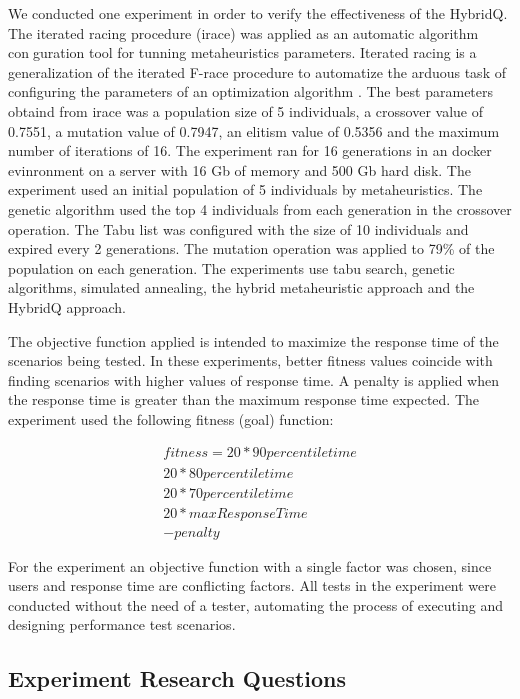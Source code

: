 \documentclass[espaco=umemeio,chapter=TITLE,twoside,openright]{abnt}
\begin{document}
We conducted one experiment in order to verify the effectiveness of the HybridQ. The iterated racing procedure (irace) was applied as an automatic algorithm conguration tool for tunning metaheuristics parameters. Iterated racing is a generalization of the iterated F-race procedure to automatize the arduous task of configuring the parameters of an optimization algorithm \cite{ManuelLopez-IbanezJeremieDubois-LacosteLesliePerezCaceresMauroBirattari2016}. The best parameters obtaind from irace was a population size of 5 individuals, a crossover value of 0.7551, a mutation value of 0.7947, an elitism value of 0.5356 and the maximum number of iterations of 16. The experiment ran for 16 generations in an docker evinronment on a server with 16 Gb of memory and 500 Gb hard disk. The experiment used an initial population of 5 individuals by metaheuristics. The genetic algorithm used the top 4 individuals from each generation in the crossover operation. The Tabu list was configured with the size of 10 individuals and expired every 2 generations.  The mutation operation was applied to 79\% of the population on each generation. The experiments use tabu search, genetic algorithms, simulated annealing, the hybrid metaheuristic approach and the HybridQ approach. 


The objective function applied is intended to maximize the response time of the scenarios being tested.  In these experiments, better fitness values coincide with finding scenarios with higher values of response time. A penalty is applied when the response time is greater than the  maximum response time expected. The experiment used the following fitness (goal) function:

\begin{equation}
\begin{aligned}
fitness=
20* 90percentiletime\\
20*80percentiletime\\
20*70percentiletime\\
20*maxResponseTime\\
-penalty
\end{aligned}
\end{equation}

For the experiment an objective function with a single factor was chosen, since users and response time are conflicting factors. All tests in the experiment were conducted without the need of a tester, automating the process of executing and designing performance test scenarios.    

\subsection{Experiment Research Questions}
\end{document}

